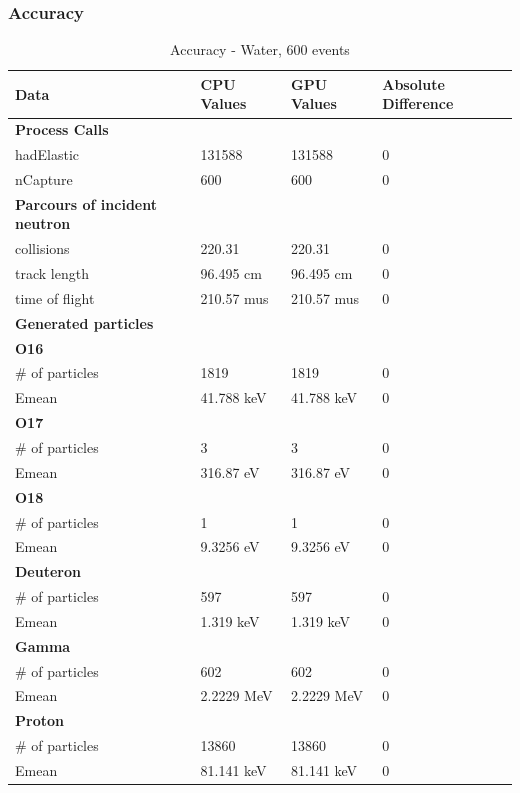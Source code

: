 \documentclass[12pt]{article}
\begin{document}
	\subsubsection{Accuracy}
		\begin{table}[H]
		\centering
		\caption{Accuracy - Water, 600 events}\label{sys3Acc}
		\begin{tabular}{llll}
		\toprule
		\bf Data &  \bf CPU Values & \bf  GPU Values & \bf Absolute Difference\\\midrule
		\bf Process Calls&&&\\
		hadElastic&131588&131588&0\\
		nCapture&600&600&0\\
	
		\midrule
		\bf Parcours of incident neutron&&&\\
		collisions&220.31&220.31&0\\
		track length&96.495 cm&96.495 cm&0\\
		time of flight&210.57 mus&210.57 mus&0\\

		\midrule
		\bf Generated particles&&&\\
		\bf{O16}&&&\\
		\# of particles&1819&1819&0\\
		Emean&41.788 keV&41.788 keV&0\\
		
		\bf{O17}&&&\\
		\# of particles&3&3&0\\
		Emean&316.87 eV&316.87 eV&0\\
		
		\bf{O18}&&&\\
		\# of particles&1&1&0\\
		Emean&9.3256 eV&9.3256 eV&0\\	
		\bf{Deuteron}&&&\\
		\# of particles&597&597&0\\
		Emean&1.319 keV&1.319 keV&0\\	
		\bf{Gamma}&&&\\
		\# of particles&602&602&0\\
		Emean&2.2229 MeV&2.2229 MeV&0\\	
		\bf{Proton}&&&\\
		\# of particles&13860&13860&0\\
		Emean&81.141 keV&81.141 keV&0\\\bottomrule
		\end{tabular}
		\end{table}
\end{document}

